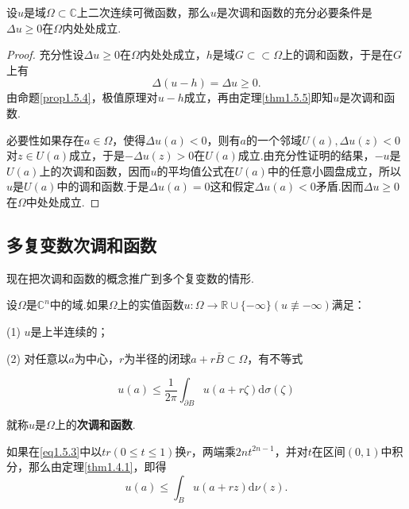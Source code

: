 \begin{theorem}\label{thm1.5.8}
	设$u$是域$\Omega\subset\mathbb{C}$上二次连续可微函数，那么$u$是次调和函数的充分必要条件是$\Delta u\ge0$在$\Omega$内处处成立.
\end{theorem}
\begin{proof}
		充分性\quad 设$\Delta u\ge0$在$\Omega$内处处成立，$h$是域$G\subset\subset \Omega$上的调和函数，于是在$G$上有
		\[\Delta(u-h)=\Delta u\ge0.\]
		由命题\ref{prop1.5.4}，极值原理对$u-h$成立，再由定理\ref{thm1.5.5}即知$u$是次调和函数.
		
		必要性\quad 如果存在$a\in\Omega$，使得$\Delta u(a)<0$，则有$a$的一个邻域$U(a),\Delta u(z)<0$对$z\in U(a)$成立，于是$-\Delta u(z)>0$在$U(a)$成立.由充分性证明的结果，$-u$是$U(a)$上的次调和函数，因而$u$的平均值公式在$U(a)$中的任意小圆盘成立，所以$u$是$U(a)$中的调和函数.于是$\Delta u(a)=0$这和假定$\Delta u(a)<0$矛盾.因而$\Delta u\ge0$在$\Omega$中处处成立.
\end{proof}
\subsection{多复变数次调和函数}
现在把次调和函数的概念推广到多个复变数的情形.
\begin{definition}\label{def1.5.9}
	设$\Omega$是$\mathbb{C}^n$中的域.如果$\Omega$上的实值函数$u\colon\Omega\to\mathbb{R}\cup\{-\infty\}(u\not\equiv-\infty)$满足：
	
	(1)\hypertarget{1.5.9}{}
	$u$是上半连续的；
	
	(2)\hypertarget{1.5.9}{}
	对任意以$a$为中心，$r$为半径的闭球$a+r\bar{B}\subset\Omega$，有不等式
	
	\begin{equation}\label{eq1.5.3}
		u(a)\le\frac1{2\pi} \int_{\partial B} u(a+r\zeta)\mathrm{d}\sigma(\zeta)
	\end{equation}
	
	就称$u$是$\Omega$上的\textbf{次调和函数}.
\end{definition}
如果在\eqref{eq1.5.3}中以$tr(0\le t\le 1)$换$r$，两端乘$2nt^{2n-1}$，并对$t$在区间$(0,1)$中积分，那么由定理\ref{thm1.4.1}，即得
\begin{equation}\label{eq1.5.4}
	u(a)\le\int_{B} u(a+rz)\mathrm{d}\nu(z).
\end{equation}

